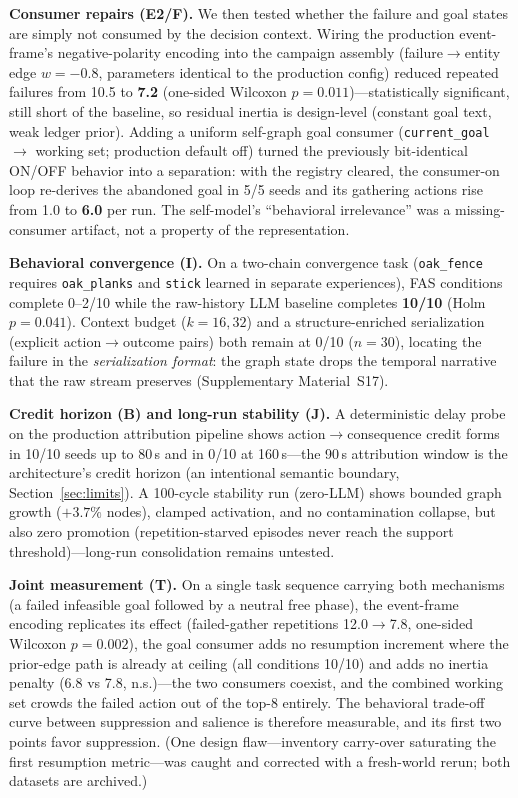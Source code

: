 \textbf{Consumer repairs (E2/F).} We then tested whether the failure
and goal states are simply not consumed by the decision context.
Wiring the production event-frame's negative-polarity encoding into
the campaign assembly (failure$\rightarrow$entity edge $w{=}{-}0.8$,
parameters identical to the production config) reduced repeated
failures from 10.5 to \textbf{7.2} (one-sided Wilcoxon
$p{=}0.011$)---statistically significant, still short of the baseline,
so residual inertia is design-level (constant goal text, weak ledger
prior). Adding a uniform self-graph goal consumer
(\texttt{current\_goal} $\rightarrow$ working set; production default
off) turned the previously bit-identical ON/OFF behavior into a
separation: with the registry cleared, the consumer-on loop re-derives
the abandoned goal in 5/5 seeds and its gathering actions rise from
1.0 to \textbf{6.0} per run. The self-model's ``behavioral
irrelevance'' was a missing-consumer artifact, not a property of the
representation.

\textbf{Behavioral convergence (I).} On a two-chain convergence task
(\texttt{oak\_fence} requires \texttt{oak\_planks} and \texttt{stick}
learned in separate experiences), FAS conditions complete 0--2/10
while the raw-history LLM baseline completes \textbf{10/10} (Holm
$p{=}0.041$). Context budget ($k{=}16,32$) and a structure-enriched
serialization (explicit action$\rightarrow$outcome pairs) both remain
at 0/10 ($n{=}30$), locating the failure in the \emph{serialization
format}: the graph state drops the temporal narrative that the raw
stream preserves (Supplementary Material~S17).

\textbf{Credit horizon (B) and long-run stability (J).} A deterministic
delay probe on the production attribution pipeline shows
action$\rightarrow$consequence credit forms in 10/10 seeds up to 80\,s
and in 0/10 at 160\,s---the 90\,s attribution window is the
architecture's credit horizon (an intentional semantic boundary,
Section~\ref{sec:limits}). A 100-cycle stability run (zero-LLM) shows
bounded graph growth ($+3.7\%$ nodes), clamped activation, and no
contamination collapse, but also zero promotion (repetition-starved
episodes never reach the support threshold)---long-run consolidation
remains untested.

\textbf{Joint measurement (T).} On a single task sequence carrying
both mechanisms (a failed infeasible goal followed by a neutral free
phase), the event-frame encoding replicates its effect
(failed-gather repetitions 12.0$\rightarrow$7.8, one-sided Wilcoxon
$p{=}0.002$), the goal consumer adds no resumption increment where the
prior-edge path is already at ceiling (all conditions 10/10) and adds
no inertia penalty (6.8 vs 7.8, n.s.)---the two consumers coexist, and
the combined working set crowds the failed action out of the top-8
entirely. The behavioral trade-off curve between suppression and
salience is therefore measurable, and its first two points favor
suppression. (One design flaw---inventory carry-over saturating the
first resumption metric---was caught and corrected with a fresh-world
rerun; both datasets are archived.)

